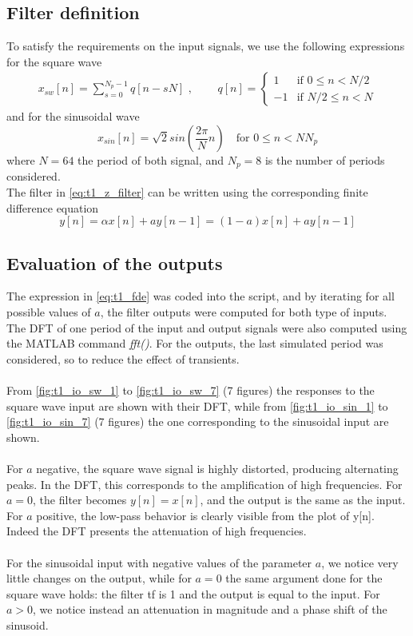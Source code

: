 \subsection{Filter definition}
To satisfy the requirements on the input signals, we use the following expressions for the square wave
\begin{gather}
x_{sw}[n]=\sum_{s=0}^{N_p-1} q[n-sN]  \text{ , }\qquad  q[n]=\begin{cases}
1 & \text{if $0\le n < N/2$}\\
-1 & \text{if $N/2\le n < N$}
\end{cases}
\end{gather}
and for the sinusoidal wave
\begin{equation}
x_{sin}[n]= \sqrt{2}  sin \left(\frac{2 \pi}{N} n\right) \quad \text{for } 0\le n < N N_p
\end{equation}
where $N=64$ the period of both signal, and $N_p=8$ is the number of periods considered.\\
The filter in \cref{eq:t1_z_filter} can be written using the corresponding finite difference equation
\begin{equation}\label{eq:t1_fde}
y[n]=\alpha x[n] + a y[n-1] = (1-a) x[n] + a y[n-1]
\end{equation}
\subsection{Evaluation of the outputs}
The expression in \cref{eq:t1_fde} was coded into the script, and by iterating for all possible values of $a$, the filter outputs were computed for both type of inputs. \\
The DFT of one period of the input and output signals were also computed using the MATLAB command \textit{fft()}. For the outputs, the last simulated period was considered, so to reduce the effect of transients.\\
\\
From \cref{fig:t1_io_sw_1} to \cref{fig:t1_io_sw_7} (7 figures) the responses to the square wave input are shown with their DFT, while from \cref{fig:t1_io_sin_1} to \cref{fig:t1_io_sin_7} (7 figures) the one corresponding to the sinusoidal input are shown.\\
\\
For $a$ negative, the square wave signal is highly distorted, producing alternating peaks. In the DFT, this corresponds to the amplification of high frequencies.
For $a=0$, the filter becomes $y[n]=x[n]$, and the output is the same as the input.
For $a$ positive, the low-pass behavior is clearly visible from the plot of y[n]. Indeed the DFT presents the attenuation of high frequencies.\\
\\
For the sinusoidal input with negative values of the parameter $a$, we notice very little changes on the output, while for $a=0$ the same argument done for the square wave holds: the filter tf is 1 and the output is equal to the input. For $a>0$, we notice instead an attenuation in magnitude and a phase shift of the sinusoid.
